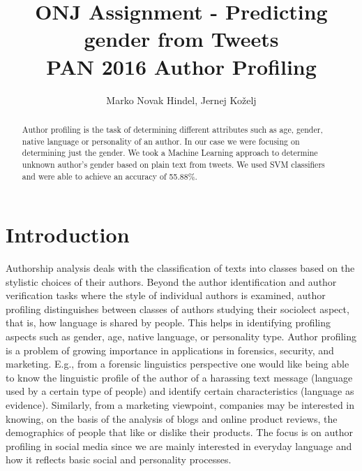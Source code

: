 \documentclass{llncs}
\begin{document}
\title{ONJ Assignment - Predicting gender from Tweets \\
	\large PAN 2016 Author Profiling\\}


\author{Marko Novak Hindel, Jernej Ko{\v{z}}elj} 
\maketitle

\begin{abstract}
Author profiling is the task of determining different attributes such as age, gender, native language or personality of an author. In our case we were focusing on determining just the gender. We took a Machine Learning approach to determine unknown author's gender based on plain text from tweets. We used SVM classifiers and were able to achieve an accuracy of 55.88\%.

\end{abstract}

\bigskip

\section{Introduction}\label{sec:Introduction}
Authorship analysis deals with the classification of texts into classes based on the stylistic choices of their authors. Beyond the author identification and author verification tasks where the style of individual authors is examined, author profiling distinguishes between classes of authors studying their sociolect aspect, that is, how language is shared by people. This helps in identifying profiling aspects such as gender, age, native language, or personality type. Author profiling is a problem of growing importance in applications in forensics, security, and marketing. E.g., from a forensic linguistics perspective one would like being able to know the linguistic profile of the author of a harassing text message (language used by a certain type of people) and identify certain characteristics (language as evidence). Similarly, from a marketing viewpoint, companies may be interested in knowing, on the basis of the analysis of blogs and online product reviews, the demographics of people that like or dislike their products. The focus is on author profiling in social media since we are mainly interested in everyday language and how it reflects basic social and personality processes\cite{PAN2016}.
\end{document}
